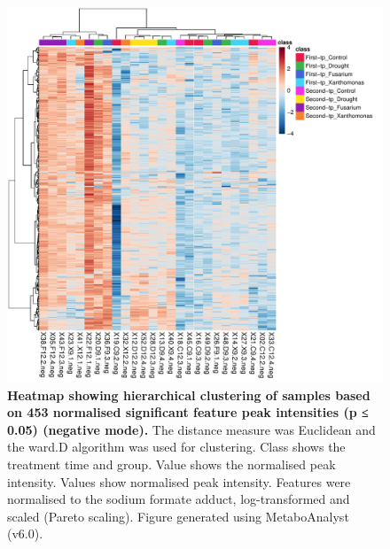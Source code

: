 \newpage
\begin{figure}[htp!]
    \centering
    \includegraphics[width=\textwidth]{Appendices/Sig453FeaturesRedSamplesRedGroups.pdf}
    \caption[Heatmap showing hierarchical clustering of samples based on 453 normalised significant feature peak intensities (p ≤ 0.05) (negative mode)]{\textbf{Heatmap showing hierarchical clustering of samples based on 453 normalised significant feature peak intensities (p ≤ 0.05) (negative mode).} The distance measure was Euclidean and the ward.D algorithm was used for clustering. Class shows the treatment time and group. Value shows the normalised peak intensity. Values show normalised peak intensity. Features were normalised to the sodium formate  adduct, log-transformed and scaled (Pareto scaling). Figure generated using MetaboAnalyst (v6.0).}
    \label{fig:Sig543FeaturesNegMode}
\end{figure}

